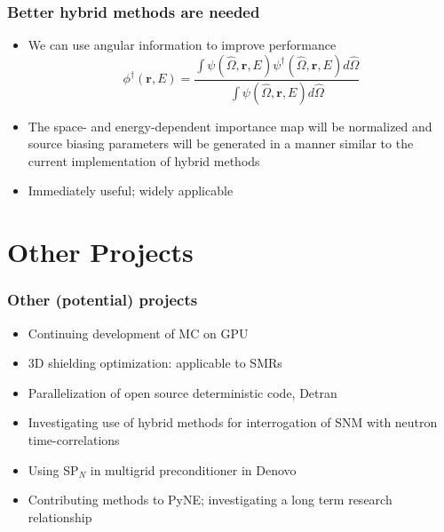 \documentclass[xcolor=x11names,compress]{beamer}
\renewcommand{\(}{\begin{columns}}
\renewcommand{\)}{\end{columns}}
\newcommand{\<}[1]{\begin{column}{#1}}
\renewcommand{\>}{\end{column}}
\newcommand{\vOmega}{\ensuremath{\hat{\Omega}}}
\newcommand{\ve}[1]{\ensuremath{\mathbf{#1}}}
\begin{document}
\begin{frame}[fragile]
  \frametitle{Better hybrid methods are needed}

	\begin{itemize}
	\item We can use angular information to improve performance
		\begin{equation}
		\phi^{\dagger}(\ve{r},E) = \frac{\int \psi(\vOmega, \ve{r},E) \psi^{\dagger}(\vOmega, \ve{r},E) d\vOmega}{\int \psi(\vOmega, \ve{r},E)  d\vOmega}
		\end{equation}

	\item The space- and energy-dependent importance map will be normalized and source biasing parameters will be generated in a manner similar to the current implementation of hybrid methods
	\item Immediately useful; widely applicable
	\end{itemize}

\end{frame}



\section{Other Projects}
\begin{frame}[fragile]
  \frametitle{Other (potential) projects}

  	\begin{itemize}
  	\item Continuing development of MC on GPU
	\item 3D shielding optimization: applicable to SMRs 
	\item Parallelization of open source deterministic code, Detran 
	\item Investigating use of hybrid methods for interrogation of SNM with neutron time-correlations 
	\item Using SP$_N$ in multigrid preconditioner in Denovo 
	\item Contributing methods to PyNE; investigating a long term research relationship
	\end{itemize}
	
\end{frame}


\end{document}
